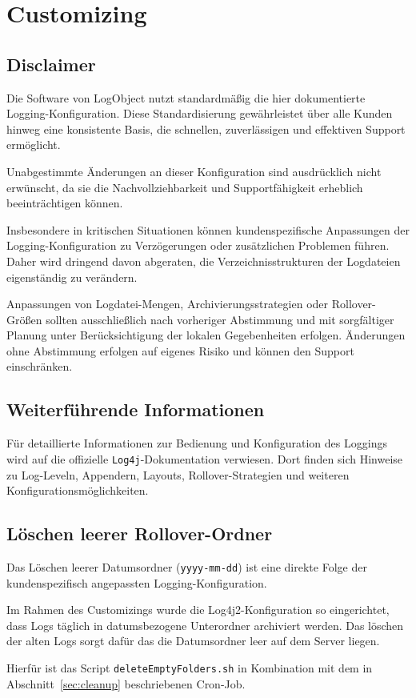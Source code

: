 \chapter{Customizing}

\section{Disclaimer}
Die Software von LogObject nutzt standardmäßig die hier dokumentierte Logging-Konfiguration.
Diese Standardisierung gewährleistet über alle Kunden hinweg eine konsistente Basis, die schnellen, zuverlässigen und effektiven Support ermöglicht.

Unabgestimmte Änderungen an dieser Konfiguration sind ausdrücklich nicht erwünscht, da sie die Nachvollziehbarkeit und Supportfähigkeit erheblich beeinträchtigen können.

Insbesondere in kritischen Situationen können kundenspezifische Anpassungen der Logging-Kon\-fi\-gu\-ra\-tion zu Verzögerungen oder zusätzlichen Problemen führen.
Daher wird dringend davon abgeraten, die Verzeichnisstrukturen der Logdateien eigenständig zu verändern.

Anpassungen von Logdatei-Mengen, Archivierungsstrategien oder Rollover-Größen sollten ausschließlich nach vorheriger Abstimmung und mit sorgfältiger Planung unter Berücksichtigung der lokalen Gegebenheiten erfolgen. Änderungen ohne Abstimmung erfolgen auf eigenes Risiko und können den Support einschränken.

\section{Weiterführende Informationen}

Für detaillierte Informationen zur Bedienung und Konfiguration des Loggings wird auf die offizielle \texttt{Log4j}-Dokumentation verwiesen.
Dort finden sich Hinweise zu Log-Leveln, Appendern, Layouts, Rollover-Strategien und weiteren Konfigurationsmöglichkeiten.

\section{Löschen leerer Rollover-Ordner}
\label{sec:customizing_cleanup}
Das Löschen leerer Datumsordner (\texttt{yyyy-mm-dd}) ist eine direkte Folge der
kundenspezifisch angepassten Logging-Konfiguration.

Im Rahmen des Customizings wurde die Log4j2-Konfiguration so eingerichtet, dass Logs
täglich in datumsbezogene Unterordner archiviert werden. Das löschen der alten Logs sorgt dafür das die Datumsordner leer auf dem Server liegen.

Hierfür  ist das Script \texttt{deleteEmptyFolders.sh} in Kombination mit dem in Abschnitt~\ref{sec:cleanup} beschriebenen Cron-Job.

